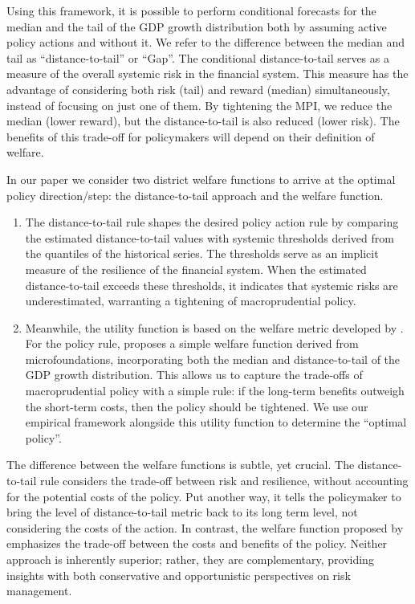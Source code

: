 \documentclass[12pt,a4paper]{article}
\begin{document}
Using this framework, it is possible to perform conditional forecasts for the median and the tail of the GDP growth distribution both by assuming active policy actions and without it. We refer to the difference between the median and tail as ``distance-to-tail'' or ``Gap''. The conditional distance-to-tail serves as a measure of the overall systemic risk in the financial system. This measure has the advantage of considering both risk (tail) and reward (median) simultaneously, instead of focusing on just one of them. By tightening the MPI, we reduce the median (lower reward), but the distance-to-tail is also reduced (lower risk). The benefits of this trade-off for policymakers will depend on their definition of welfare.

In our paper we consider two district welfare functions to arrive at the optimal policy direction/step: the distance-to-tail approach \citep{esrb2024} and the \citet{suarez2022} welfare function. 
\begin{enumerate}
    \item The distance-to-tail rule shapes the desired policy action rule by comparing the estimated distance-to-tail values with systemic thresholds derived from the quantiles of the historical series. The thresholds serve as an implicit measure of the resilience of the financial system. When the estimated distance-to-tail exceeds these thresholds, it indicates that systemic risks are underestimated, warranting a tightening of macroprudential policy.
    \item Meanwhile, the utility function is based on the welfare metric developed by \citet{suarez2022}. For the policy rule, \citet{suarez2022} proposes a simple welfare function derived from microfoundations, incorporating both the median and distance-to-tail of the GDP growth distribution. This allows us to capture the trade-offs of macroprudential policy with a simple rule: if the long-term benefits outweigh the short-term costs, then the policy should be tightened. We use our empirical framework alongside this utility function to determine the ``optimal policy''.
\end{enumerate}
 

The difference between the welfare functions is subtle, yet crucial. The distance-to-tail rule considers the trade-off between risk and resilience, without accounting for the potential costs of the policy. Put another way, it tells the policymaker to bring the level of distance-to-tail metric back to its long term level, not considering the costs of the action. In contrast, the welfare function proposed by \citet{suarez2022} emphasizes the trade-off between the costs and benefits of the policy. Neither approach is inherently superior; rather, they are complementary, providing insights with both conservative and opportunistic perspectives on risk management.
\end{document}
